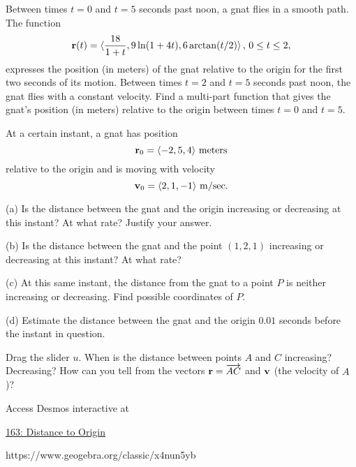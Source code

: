 \documentclass{ximera}
\begin{document}
\begin{question}  \label{Qdgtbyt5:Motion}
Between times $t=0$ and $t=5$ seconds past noon, a gnat flies in a smooth path. The function 
\[
       {\bf r}(t) =  \langle  \frac{18 }{1+t} , 9\ln (1+4t) , 6\arctan(t/2) \rangle \, , \, 0\leq t \leq 2 ,
\]
expresses the position (in meters) of the gnat relative to the origin for the first two seconds of its motion. Between times $t=2$ and $t=5$ seconds past noon, the gnat flies with a constant velocity. Find a multi-part function that gives the gnat's position (in meters) relative to the origin between times $t=0$ and $t=5$. 

\end{question}


\begin{question} \label{Qcbh65y6:Motion}
At a certain instant, a gnat has position
\[
   {\bf r}_0 = \langle -2, 5, 4\rangle \text{ meters}
\]
relative to the origin and is moving with velocity
\[
  {\bf v}_0 = \langle  2, 1,-1  \rangle \text{ m/sec} .
\]

(a) Is the distance between the gnat and the origin increasing or decreasing at this instant? At what rate? Justify your answer.

(b) Is the distance between the gnat and the point $(1,2,1)$ increasing or decreasing at this instant? At what rate? 

(c) At this same instant, the distance from the gnat to a point $P$ is neither increasing or decreasing. Find possible coordinates of $P$.

(d) Estimate the distance between the gnat and the origin $0.01$ seconds before the instant in question.


\begin{exploration} \label{Edsss4tDE}
Drag the slider $u$. When is the distance between points $A$ and $C$ increasing? Decreasing? How can you tell from the vectors ${\bf r}=\overrightarrow{AC}$ and ${\bf v}$ (the velocity of $A$)?

Access Desmos interactive at
 
\href{https://www.geogebra.org/classic/x4nun5yb}{163: Distance to Origin}

 
\begin{onlineOnly}
    \begin{center}
\end{center}
\end{onlineOnly}


\end{exploration}

https://www.geogebra.org/classic/x4nun5yb


\end{question}
\end{document}
